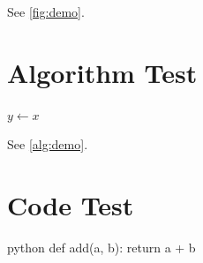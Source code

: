 \documentclass{article}
\begin{document}
See \cref{fig:demo}.
\section*{Algorithm Test}
\begin{algorithm}[htbp]
  \caption{Demo algorithm}
  \label{alg:demo}
  \BlankLine
  $y \leftarrow x$
\end{algorithm}

See \cref{alg:demo}.

\section*{Code Test}
\begin{hypocode}{python}
def add(a, b):
  return a + b
\end{hypocode}
\end{document}
